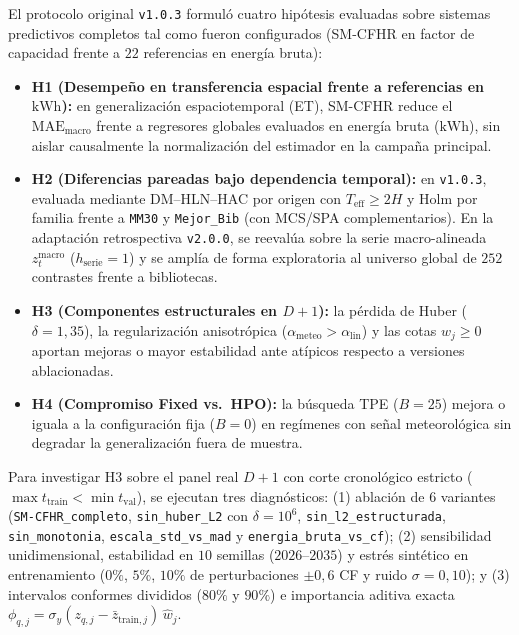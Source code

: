 El protocolo original \texttt{v1.0.3} formuló cuatro hipótesis evaluadas sobre sistemas predictivos completos tal como fueron configurados (SM-CFHR en factor de capacidad frente a $22$ referencias en energía bruta):
\begin{itemize}
    \item \textbf{H1 (Desempeño en transferencia espacial frente a referencias en $\text{kWh}$):} en generalización espaciotemporal (ET), SM-CFHR reduce el $\mathrm{MAE}_{\mathrm{macro}}$ frente a regresores globales evaluados en energía bruta ($\text{kWh}$), sin aislar causalmente la normalización del estimador en la campaña principal.
    \item \textbf{H2 (Diferencias pareadas bajo dependencia temporal):} en \texttt{v1.0.3}, evaluada mediante DM--HLN--HAC por origen con $T_{\mathrm{eff}} \ge 2H$ y Holm por familia frente a \texttt{MM30} y \texttt{Mejor\_Bib} (con MCS/SPA complementarios). En la adaptación retrospectiva \texttt{v2.0.0}, se reevalúa sobre la serie macro-alineada $z_t^{\mathrm{macro}}$ ($h_{\mathrm{serie}}=1$) y se amplía de forma exploratoria al universo global de $252$ contrastes frente a bibliotecas.
    \item \textbf{H3 (Componentes estructurales en $D+1$):} la pérdida de Huber ($\delta=1{,}35$), la regularización anisotrópica ($\alpha_{\mathrm{meteo}} > \alpha_{\mathrm{lin}}$) y las cotas $w_j \ge 0$ aportan mejoras o mayor estabilidad ante atípicos respecto a versiones ablacionadas.
    \item \textbf{H4 (Compromiso Fixed vs.\ HPO):} la búsqueda TPE ($B=25$) mejora o iguala a la configuración fija ($B=0$) en regímenes con señal meteorológica sin degradar la generalización fuera de muestra.
\end{itemize}

Para investigar H3 sobre el panel real $D+1$ con corte cronológico estricto ($\max t_{\mathrm{train}} < \min t_{\mathrm{val}}$), se ejecutan tres diagnósticos: (1) ablación de $6$ variantes (\texttt{SM-CFHR\_completo}, \texttt{sin\_huber\_L2} con $\delta=10^6$, \texttt{sin\_l2\_estructurada}, \texttt{sin\_monotonia}, \texttt{escala\_std\_vs\_mad} y \texttt{energia\_bruta\_vs\_cf}); (2) sensibilidad unidimensional, estabilidad en $10$ semillas ($2026$--$2035$) y estrés sintético en entrenamiento ($0\%$, $5\%$, $10\%$ de perturbaciones $\pm 0{,}6$ CF y ruido $\sigma=0{,}10$); y (3) intervalos conformes divididos ($80\%$ y $90\%$) \cite{vovk2005conformal,lei2018conformal,barber2023nonexchangeable} e importancia aditiva exacta $\phi_{q,j} = \sigma_y (z_{q,j} - \bar{z}_{\mathrm{train},j})\,\hat{w}_j$.
